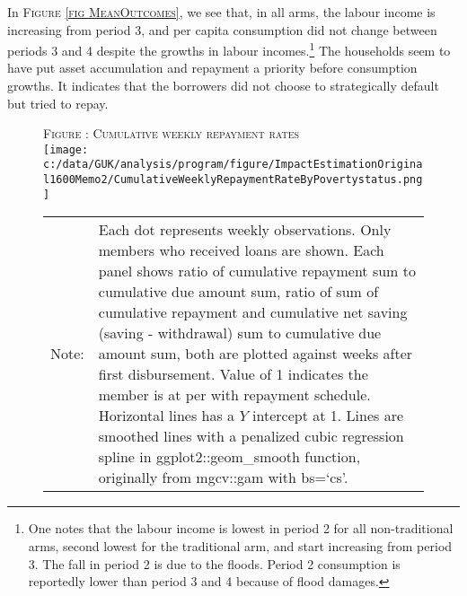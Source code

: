 	In \textsc{\footnotesize Figure \ref{fig MeanOutcomes}}, we see that, in all arms, the labour income is increasing from period 3, and per capita consumption did not change between periods 3 and 4 despite the growths in labour incomes.\footnote{One notes that the labour income is lowest in period 2 for all non-\textsf{traditional} arms, second lowest for the \textsf{traditional} arm, and start increasing from period 3. The fall in period 2 is due to the floods. Period 2 consumption is reportedly lower than period 3 and 4 because of flood damages. } %
	The households seem to have put asset accumulation and repayment a priority before consumption growths. It indicates that the borrowers did not choose to strategically default but tried to repay. 


\begin{figure}
\hfil\textsc{\footnotesize Figure \thefigure: Cumulative weekly repayment rates\label{fig weeklysavingrepayrate}}\\
\hfil\texttt{[image: c:/data/GUK/analysis/program/figure/ImpactEstimationOriginal1600Memo2/CumulativeWeeklyRepaymentRateByPovertystatus.png]}\\
\renewcommand{\arraystretch}{1}
\hfil\begin{tabular}{>{\hfill\scriptsize}p{1cm}<{}>{\scriptsize}p{12cm}<{\hfill}}
Note:& Each dot represents weekly observations. Only members who received loans are shown. Each panel shows ratio of cumulative repayment sum to cumulative due amount sum, ratio of sum of cumulative repayment and cumulative net saving (saving - withdrawal) sum to cumulative due amount sum, both are plotted against weeks after first disbursement. Value of 1 indicates the member is at per with repayment schedule. Horizontal lines has a $Y$ intercept at 1. Lines are smoothed lines with a penalized cubic regression spline in \textsf{ggplot2::geom\_smooth} function, originally from \textsf{mgcv::gam} with \textsf{bs=`cs'}. \\[-1ex]
\end{tabular}
\end{figure}



